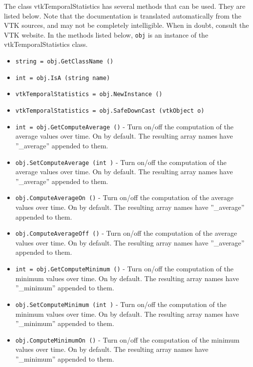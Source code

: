 The class vtkTemporalStatistics has several methods that can be used.
  They are listed below.
Note that the documentation is translated automatically from the VTK sources,
and may not be completely intelligible.  When in doubt, consult the VTK website.
In the methods listed below, \verb|obj| is an instance of the vtkTemporalStatistics class.
\begin{itemize}
\item  \verb|string = obj.GetClassName ()|

\item  \verb|int = obj.IsA (string name)|

\item  \verb|vtkTemporalStatistics = obj.NewInstance ()|

\item  \verb|vtkTemporalStatistics = obj.SafeDownCast (vtkObject o)|

\item  \verb|int = obj.GetComputeAverage ()| -  Turn on/off the computation of the average values over time.  On by
 default.  The resulting array names have ''\_average'' appended to them.

\item  \verb|obj.SetComputeAverage (int )| -  Turn on/off the computation of the average values over time.  On by
 default.  The resulting array names have ''\_average'' appended to them.

\item  \verb|obj.ComputeAverageOn ()| -  Turn on/off the computation of the average values over time.  On by
 default.  The resulting array names have ''\_average'' appended to them.

\item  \verb|obj.ComputeAverageOff ()| -  Turn on/off the computation of the average values over time.  On by
 default.  The resulting array names have ''\_average'' appended to them.

\item  \verb|int = obj.GetComputeMinimum ()| -  Turn on/off the computation of the minimum values over time.  On by
 default.  The resulting array names have ''\_minimum'' appended to them.

\item  \verb|obj.SetComputeMinimum (int )| -  Turn on/off the computation of the minimum values over time.  On by
 default.  The resulting array names have ''\_minimum'' appended to them.

\item  \verb|obj.ComputeMinimumOn ()| -  Turn on/off the computation of the minimum values over time.  On by
 default.  The resulting array names have ''\_minimum'' appended to them.


\end{itemize}
